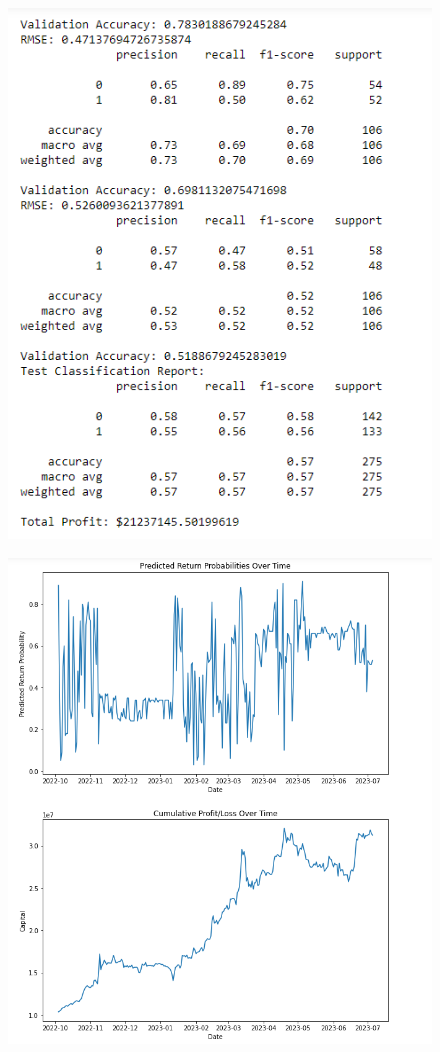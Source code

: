 \begin{figure}[H]
\centering
\includegraphics[scale=0.65]{fig21.jpg}
\end{figure}

\begin{figure}[H]
\centering
\includegraphics[scale=0.65]{fig22.jpg}
\end{figure}

